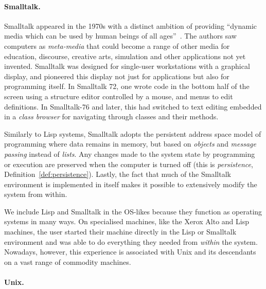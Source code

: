 \paragraph{Smalltalk.}

Smalltalk appeared in the 1970s with a distinct ambition of providing
``dynamic media which can be used by human beings of all
ages''~\cite{PersonalDynMedia}. The authors saw computers as
\emph{meta-media} that could become a range of other media for
education, discourse, creative arts, simulation and other applications
not yet invented. Smalltalk was designed for single-user workstations
with a graphical display, and pioneered this display not just for
applications but also for programming itself. In Smalltalk 72, one wrote
code in the bottom half of the screen using a structure editor
controlled by a mouse, and menus to edit definitions. In Smalltalk-76
and later, this had switched to text editing embedded in a \emph{class
browser} for navigating through classes and their methods.

Similarly to Lisp systems, Smalltalk adopts the persistent address space
model of programming where data remains in memory, but based on
\emph{objects} and \emph{message passing} instead of \emph{lists}. Any
changes made to the system state by programming or execution are
preserved when the computer is turned off (this is \emph{persistence},
Definition~\ref{def:persistence}). Lastly, the fact that much of the
Smalltalk environment is implemented in itself makes it possible to
extensively modify the system from within.

We include Lisp and Smalltalk in the OS-likes because they function as
operating systems in many ways. On specialised machines, like the Xerox
Alto and Lisp machines, the user started their machine directly in the
Lisp or Smalltalk environment and was able to do everything they needed
from \emph{within} the system. Nowadays, however, this experience is
associated with Unix and its descendants on a vast range of commodity
machines.

\paragraph{Unix.}

